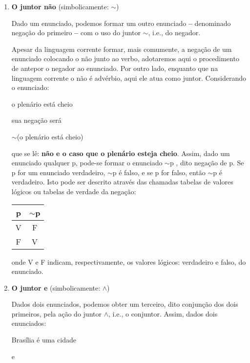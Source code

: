 \begin{enumerate}[label=\textbf{(\arabic*)}]
    \item \textbf{O juntor não} (simbolicamente: $\sim$)

    Dado um enunciado, podemos formar um outro enunciado \textbf{--} denominado negação do primeiro \textbf{--} com o uso do juntor $\sim$, i.e., do negador.

    Apesar da linguagem corrente formar, mais comumente, a negação de  um  enunciado colocando o não junto ao verbo, adotaremos aqui o procedimento de antepor o negador ao enunciado.
    Por outro lado, enquanto que na  linguagem corrente o não é advérbio, aqui ele atua como juntor.
    Considerando o enunciado:

    \begin{center}
        o plenário está cheio
    \end{center}
    sua negação será
    \begin{center}
        $\sim$(o plenário está cheio)
    \end{center}
    que se lê: \textbf{não e o caso que o plenário esteja cheio}.
    Assim, dado um enunciado qualquer p, pode-se formar o  enunciado $\sim$p , dito negação de p.
    Se p for um enunciado verdadeiro, $\sim$p é falso, e se p  for falso, então $\sim$p é verdadeiro.
    Isto pode ser descrito através das chamadas tabelas de valores lógicos ou tabelas de verdade da negação:

    \begin{center}
        \begin{tabular}{c c}
            p & $\sim$p \\ \hline
            V & F \\
            F & V
        \end{tabular}
    \end{center}

    onde V e F indicam, respectivamente, os valores lógicos: verdadeiro e falso, do enunciado.

    \item \textbf{O juntor e} (simbolicamente: $\land$)

    Dados dois enunciados, podemos obter um  terceiro, dito conjunção dos dois primeiros, pela ação do  juntor $\land$, i.e., o conjuntor.
    Assim, dados dois enunciados:

    \begin{center}
        Brasília é uma cidade

        e


\end{center}
\end{enumerate}
